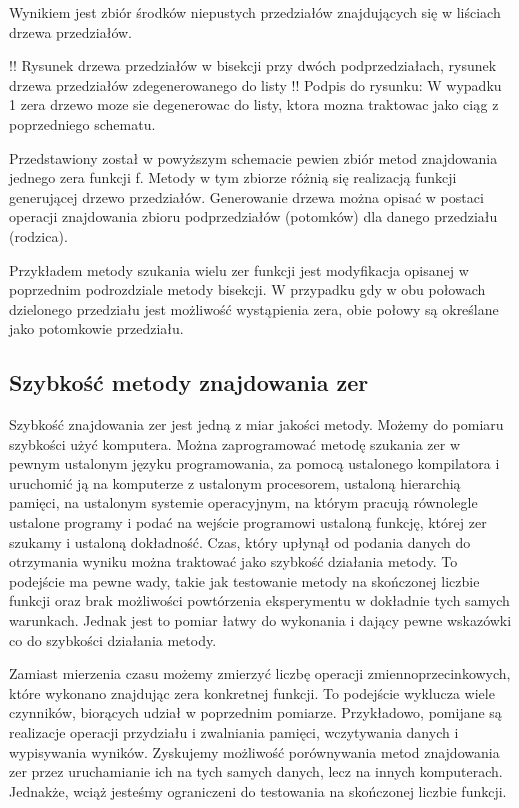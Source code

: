 \documentclass[11pt,a4paper,oneside]{report}
\begin{document}
Wynikiem jest zbiór środków niepustych przedziałów znajdujących się w liściach drzewa przedziałów.

!! Rysunek drzewa przedziałów w bisekcji przy dwóch podprzedziałach, rysunek drzewa przedziałów zdegenerowanego do listy
!! Podpis do rysunku: W wypadku 1 zera drzewo moze sie degenerowac do listy, ktora mozna traktowac jako ciąg z poprzedniego schematu.

Przedstawiony został w powyższym schemacie pewien zbiór metod znajdowania jednego zera funkcji f. Metody w tym zbiorze różnią się realizacją funkcji generującej drzewo przedziałów. Generowanie drzewa można opisać w postaci operacji znajdowania zbioru podprzedziałów (potomków) dla danego przedziału (rodzica).

Przykładem metody szukania wielu zer funkcji jest modyfikacja opisanej w poprzednim podrozdziale metody bisekcji. W przypadku gdy w obu połowach dzielonego przedziału jest możliwość wystąpienia zera, obie połowy są określane jako potomkowie przedziału.

\subsection{Szybkość metody znajdowania zer}

Szybkość znajdowania zer jest jedną z miar jakości metody. Możemy do pomiaru szybkości użyć komputera. Można zaprogramować metodę szukania zer w pewnym ustalonym języku programowania, za pomocą ustalonego kompilatora i uruchomić ją na komputerze z ustalonym procesorem, ustaloną hierarchią pamięci, na ustalonym systemie operacyjnym, na którym pracują równolegle ustalone programy i podać na wejście programowi ustaloną funkcję, której zer szukamy i ustaloną dokładność. Czas, który upłynął od podania danych do otrzymania wyniku można traktować jako szybkość działania metody. To podejście ma pewne wady, takie jak testowanie metody na skończonej liczbie funkcji oraz brak możliwości powtórzenia eksperymentu w dokładnie tych samych warunkach. Jednak jest to pomiar łatwy do wykonania i dający pewne wskazówki co do szybkości działania metody.

Zamiast mierzenia czasu możemy zmierzyć liczbę operacji zmiennoprzecinkowych, które wykonano znajdując zera konkretnej funkcji. To podejście wyklucza wiele czynników, biorących udział w poprzednim pomiarze. Przykładowo, pomijane są realizacje operacji przydziału i zwalniania pamięci, wczytywania danych i wypisywania wyników. Zyskujemy możliwość porównywania metod znajdowania zer przez uruchamianie ich na tych samych danych, lecz na innych komputerach. Jednakże, wciąż jesteśmy ograniczeni do testowania na skończonej liczbie funkcji. 
\end{document}
